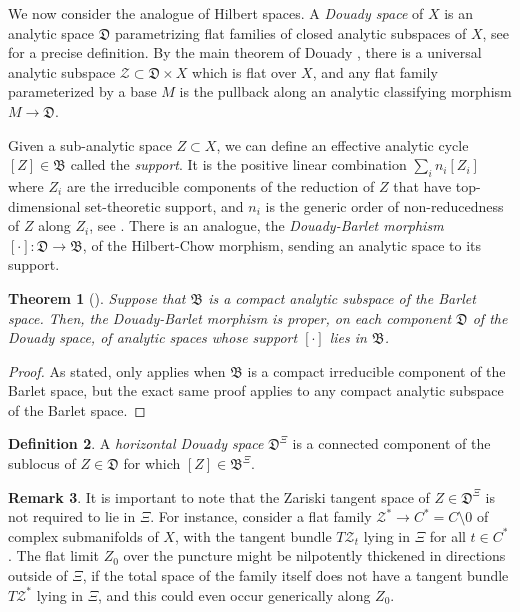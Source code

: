 \documentclass[10pt,letterpaper,english,reqno]{amsart}
\numberwithin{equation}{subsection}
\newcommand\cZ{{\mathcal Z}}
\newcommand\fB{{\mathfrak B}}
\newcommand\fD{{\mathfrak D}}
\newtheorem{theorem}{Theorem}[section]
\theoremstyle{definition}
\newtheorem{definition}[theorem]{Definition}
\newtheorem{remark}[theorem]{Remark}
\begin{document}
We now consider the analogue of Hilbert spaces. A {\it Douady space} of $X$ is an
analytic space $\fD$ parametrizing flat 
families of closed analytic subspaces of $X$, see \cite[\S 9.1]{douady} for a precise definition. By the main theorem of Douady \cite[pp.~83-84]{douady}, there is a universal analytic subspace
$\mathcal{Z}\subset \fD\times X$ which is flat over $X$,
and any flat family parameterized by a base $M$
is the pullback along an analytic classifying morphism $M\to \fD$.


Given a sub-analytic space $Z\subset X$,
we can define an effective analytic cycle $[Z]\in \fB$
called the {\it support}.
It is the positive linear combination $\sum_{i} n_i[Z_i]$ where $Z_i$
are the irreducible components of the reduction of $Z$ that have
top-dimensional set-theoretic support,
and $n_i$ is the generic order of
non-reducedness of $Z$ along $Z_i$,
see \cite[Sec.~3.1]{fujiki}. There is an analogue, the 
{\it Douady-Barlet morphism} $[\cdot ]\colon \fD\to \fB$, of the Hilbert-Chow morphism, sending an analytic space to its support.

\begin{theorem}[{\cite[Prop.~3.4]{fujiki}}]\label{fujiki}
Suppose that $\fB$ is a compact 
analytic subspace of the Barlet space.
Then, the Douady-Barlet morphism is proper, 
on each component $\fD$ of the Douady space, 
of analytic spaces whose support
$[\cdot]$ lies in $\fB$. 
\end{theorem}

\begin{proof}
As stated, \cite[Prop.~3.4]{fujiki} only applies 
when $\fB$ is a compact irreducible component
of the Barlet space, but the
exact same proof applies to any
compact analytic subspace of the Barlet space.
\end{proof}

\begin{definition}A {\it horizontal Douady space} $\fD^{\Xi}$ is a connected component of
the sublocus of $Z\in \fD$ for
which $[Z]\in \fB^{\Xi}.$ \end{definition}

\begin{remark} It is important to note that the Zariski tangent
space of $Z\in \fD^{\Xi}$ is not required to lie in $\Xi$.
For instance, consider a flat family $\cZ^* \to C^*=C\setminus 0$
of complex submanifolds of 
$X$, with the tangent bundle $T\cZ_t$ lying in $\Xi$
for all $t\in C^*$. The flat limit $Z_0$
over the puncture might be nilpotently thickened in directions outside 
of $\Xi$, if the total space of the family itself does not have a tangent 
bundle $T\cZ^*$ lying in $\Xi$, and this could even occur generically along $Z_0$.
\end{remark}
\end{document}
